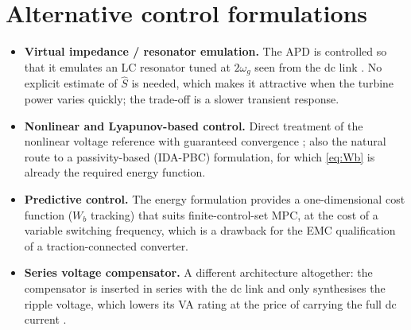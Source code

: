 \documentclass[11pt,a4paper]{article}
\begin{document}
\section{Alternative control formulations}

\begin{itemize}
\item \textbf{Virtual impedance / resonator emulation.} The APD is controlled so
that it emulates an LC resonator tuned at $2\omega_g$ seen from the dc link
\cite{liu2021lcresonator}. No explicit estimate of $\hat S$ is needed, which
makes it attractive when the turbine power varies quickly; the trade-off is a
slower transient response.

\item \textbf{Nonlinear and Lyapunov-based control.} Direct treatment of the
nonlinear voltage reference with guaranteed convergence
\cite{yuan2019nonlinear,liu2024lyapunov}; also the natural route to a
passivity-based (IDA-PBC) formulation, for which \eqref{eq:Wb} is already the
required energy function.

\item \textbf{Predictive control.} The energy formulation provides a
one-dimensional cost function ($W_b$ tracking) that suits finite-control-set
MPC, at the cost of a variable switching frequency, which is a drawback for the
EMC qualification of a traction-connected converter.

\item \textbf{Series voltage compensator.} A different architecture altogether:
the compensator is inserted in series with the dc link and only synthesises the
ripple voltage, which lowers its VA rating at the price of carrying the full dc
current \cite{wang2014series}.
\end{itemize}
\end{document}
